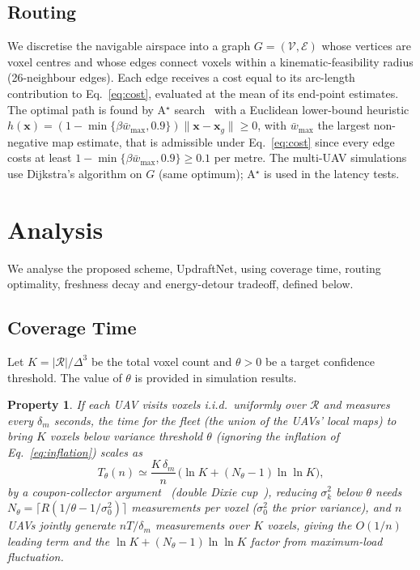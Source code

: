\documentclass[conference]{IEEEtran}
\newcommand{\rd}[1]{#1}   %
\newcommand{\rdisp}{}     %
\newtheorem{property}{Property}
\begin{document}
\subsection{Routing}

We discretise the navigable airspace into a graph $G=(\mathcal{V},\mathcal{E})$
whose vertices are voxel centres and whose edges
connect voxels within a kinematic-feasibility radius \rd{(26-neighbour edges)}. Each edge
receives a cost equal to its arc-length contribution to Eq.~\eqref{eq:cost}\rd{, evaluated at the mean of its end-point estimates}.
The optimal path is found by A$^\star$ search~\cite{hart} with a Euclidean
lower-bound heuristic \rd{$h(\mathbf{x})=(1-\min\{\beta\bar{w}_{\max},0.9\})\|\mathbf{x}-\mathbf{x}_g\|\ge0$, with $\bar{w}_{\max}$ the largest non-negative map estimate,}
that is admissible under Eq.~\eqref{eq:cost} \rd{since every edge costs at least $1-\min\{\beta\bar{w}_{\max},0.9\}\ge0.1$ per metre. The multi-UAV simulations use Dijkstra's algorithm on $G$ (same optimum); A$^\star$ is used in the latency tests.}

\section{Analysis}
\label{sec:analysis}
We analyse the proposed scheme, UpdraftNet, using coverage time, routing
optimality, freshness decay and energy-detour tradeoff, defined below.

\subsection{Coverage Time}

Let $K=|\mathcal{R}|/\rd{\Delta}^3$ be the total voxel count and $\theta>0$ be
a target confidence threshold. The value of $\theta$ is provided in
simulation results.

\begin{property}
\label{prop:coverage}
If each UAV visits voxels i.i.d.\ uniformly over $\mathcal{R}$ and
\rd{measures every $\delta_m$ seconds}, the time \rd{for the fleet (the union of the UAVs' local maps)} to bring $K$ voxels
below variance threshold $\theta$ \rd{(ignoring the inflation of Eq.~\eqref{eq:inflation})} scales as
\begin{equation}
T_{\theta}(n) \rd{\simeq} \frac{K\,\rdisp\delta_m}{n}\,\rdisp
\bigl(\ln K+(N_\theta-1)\ln\ln K\bigr),
\label{eq:coverage}
\end{equation}
by a coupon-collector argument~\cite{motwani,doerr}\rd{ (double Dixie cup~\cite{newman}),}
reducing $\sigma_k^2$ below $\theta$ needs \rd{$N_\theta=\lceil R(1/\theta-1/\sigma_0^2)\rceil$ measurements per voxel ($\sigma_0^2$ the prior variance)}, and $n$ UAVs
jointly generate \rd{$nT/\delta_m$} measurements over $K$ voxels, giving
the $O(1/n)$ leading term and \rd{the $\ln K+(N_\theta-1)\ln\ln K$ factor} from
maximum-load fluctuation.
\end{property}
\end{document}
